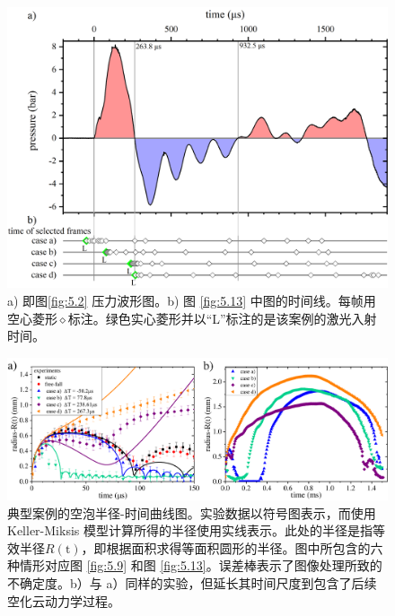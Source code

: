 \begin{figure}[H]
  \centering
  \includegraphics[width=1\linewidth]{img/fig5.11.png}
  \caption[压力波形与照片对应图]{ a) 即图\ref{fig:5.2} 压力波形图。b) 图 \ref{fig:5.13}
中图的时间线。每帧用空心菱形$\diamond$标注。绿色实心菱形并以``L''标注的是该案例的激光入射时间。}
  \label{fig:5.11}
\end{figure}



\begin{figure}[H]
  \centering
  \includegraphics[width=1\linewidth]{img/fig5.12.pdf}
  \caption[典型案例的空泡半径-时间曲线图]{典型案例的空泡半径-时间曲线图。实验数据以符号图表示，而使用
Keller-Miksis
模型计算所得的半径使用实线表示。此处的半径是指等效半径$R (\text{t})$，即根据面积求得等面积圆形的半径。图中所包含的六种情形对应图
\ref{fig:5.9} 和图 \ref{fig:5.13}。误差棒表示了图像处理所致的不确定度。b）与
a）同样的实验，但延长其时间尺度到包含了后续空化云动力学过程。
}
  \label{fig:5.12}
\end{figure}



